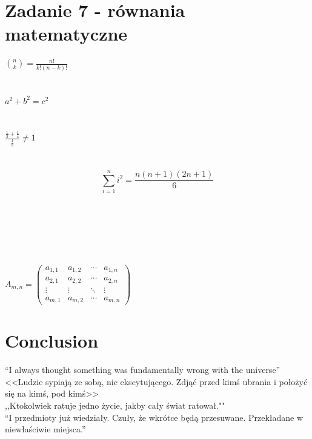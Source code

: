 \documentclass{article}
\begin{document}
\section{Zadanie 7 - równania matematyczne}
{\Huge
$\binom{n}{k} = \frac{n!}{k!(n-k)!}$~\\\\\\
$a^2 + b^2 = c^2$~\\\\\\
$\frac{\frac{1}{2}+\frac{1}{4}}{\frac{1}{8}} \neq 1$~\\\\\\

\begin{displaymath}
\sum_{i=1}^{n} i^2 
= \frac{n(n+1)(2n+1)}{6}
\end{displaymath}
~\\\\\\
~\\\\\\
$A_{m,n} = 
 \begin{pmatrix}
  a_{1,1} & a_{1,2} & \cdots & a_{1,n} \\
  a_{2,1} & a_{2,2} & \cdots & a_{2,n} \\
  \vdots  & \vdots  & \ddots & \vdots  \\
  a_{m,1} & a_{m,2} & \cdots & a_{m,n} 
 \end{pmatrix}$
}

\section{Conclusion}
``I always thought something was fundamentally wrong with the universe'' \citep{adams1995hitchhiker}~\\
<<Ludzie sypiają ze sobą, nic ekscytującego. Zdjąć przed kimś ubrania i położyć się na kimś, pod kimś>> \citep{jakub2018zulczyk}~\\
,,Ktokolwiek ratuje jedno życie, jakby cały świat ratował."" \citep{heather2018morris}~\\
``I przedmioty już wiedziały. Czuły, że wkrótce będą przesuwane. Przekładane w niewłaściwie miejsca.''
\citep{marcin2017wicha}~\\



\end{document}
